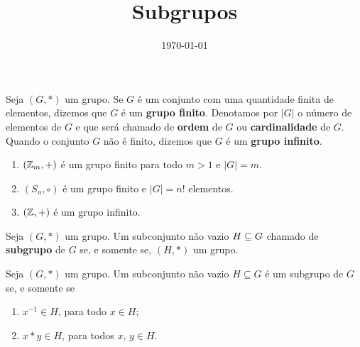\documentclass{beamer}
\title{Subgrupos}
\author[\autor]{\autor}
\institute[\instituto]{\instituto}
\date{\today}
\begin{document}
    \begin{frame}
        \maketitle
    \end{frame}


    \begin{frame}
        \begin{definicao}
            Seja $(G,*)$ um grupo. \pause Se $G$ {\'e} um conjunto com uma quantidade finita de elementos, \pause dizemos que $G$ {\'e} um \textbf{grupo finito}. \pause Denotamos por $|G|$ \pause o n{\'u}mero de elementos de $G$ \pause e que ser{\'a} chamado de \textbf{ordem} de $G$ \pause ou \textbf{cardinalidade} de $G$. \pause Quando o conjunto $G$ n{\~a}o {\'e} finito, \pause dizemos que $G$ {\'e} um \textbf{grupo infinito}.\pause
        \end{definicao}

        \begin{exemplos}
            \begin{enumerate}[label={\arabic*})]
                \item $(\mathbb{Z}_m, +)$ {\'e} um grupo finito para todo $m>1$ \pause e $|G| = m$.\pause
                \item $(S_n, \circ)$ \'e um grupo finito \pause e $|G| = n!$ elementos.\pause
                \item $(\mathbb{Z}, +)$ {\'e} um grupo infinito.
            \end{enumerate} 
        \end{exemplos}
    \end{frame}

    \begin{frame}
        \begin{definicao}
            Seja $(G,*)$ um grupo. \pause Um subconjunto n{\~a}o vazio \pause $H\subseteq G$  chamado de \textbf{subgrupo} de $G$ \pause se, e somente se, $(H,*)$  um grupo.\pause
        \end{definicao}

        \begin{proposicao}
            Seja $(G, *)$ um grupo. \pause Um subconjunto n{\~a}o vazio \pause $H\subseteq G$ {\'e} um subgrupo de $G$ \pause se, e somente se\pause
            \begin{enumerate}[label={\roman*})]
                \item\label{subgrupo_condicao_1} $x^{-1}\in H$, \pause para todo $x \in H$;
                \item\label{subgrupo_condicao_2} $x*y\in H$, \pause para todos $x$, $y \in H$.\pause
            \end{enumerate}
        \end{proposicao}
    \end{frame}
\end{document}
